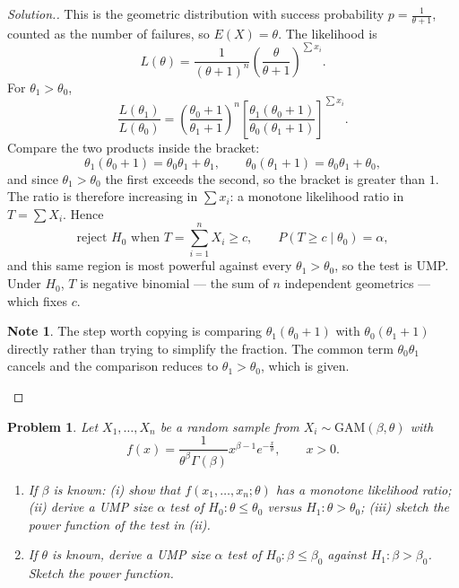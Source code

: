 \documentclass[12pt,a4paper]{report}
\theoremstyle{definition}
\newtheorem{note}[thm]{Note}
\theoremstyle{plain}
\newtheorem{problemx}{Problem}[section]
\newenvironment{problem}{\begin{problemx}}{\end{problemx}}
\newenvironment{solution}
  {\renewcommand{\qedsymbol}{}\begin{proof}[\textit{Solution}.]}
  {\end{proof}}
\begin{document}
\begin{solution}
This is the geometric distribution with success probability
$p=\frac{1}{\theta+1}$, counted as the number of failures, so $E(X)=\theta$. The
likelihood is
\[L(\theta)=\frac{1}{(\theta+1)^n}\left(\frac{\theta}{\theta+1}\right)^{\sum x_i}.\]
For $\theta_1>\theta_0$,
\[\frac{L(\theta_1)}{L(\theta_0)}
=\left(\frac{\theta_0+1}{\theta_1+1}\right)^{n}
\left[\frac{\theta_1(\theta_0+1)}{\theta_0(\theta_1+1)}\right]^{\sum x_i}.\]
Compare the two products inside the bracket:
\[\theta_1(\theta_0+1)=\theta_0\theta_1+\theta_1,\qquad
\theta_0(\theta_1+1)=\theta_0\theta_1+\theta_0,\]
and since $\theta_1>\theta_0$ the first exceeds the second, so the bracket is
greater than $1$. The ratio is therefore increasing in $\sum x_i$: a monotone
likelihood ratio in $T=\sum X_i$. Hence
\[\text{reject } H_0 \text{ when } T=\sum_{i=1}^nX_i\geq c,\qquad
P\left(T\geq c\mid\theta_0\right)=\alpha,\]
and this same region is most powerful against every $\theta_1>\theta_0$, so the
test is UMP. Under $H_0$, $T$ is negative binomial --- the sum of $n$ independent
geometrics --- which fixes $c$.

\begin{note}
The step worth copying is comparing $\theta_1(\theta_0+1)$ with
$\theta_0(\theta_1+1)$ directly rather than trying to simplify the fraction. The
common term $\theta_0\theta_1$ cancels and the comparison reduces to
$\theta_1>\theta_0$, which is given.
\end{note}
\end{solution}

\begin{problem}
Let $X_1,\ldots,X_n$ be a random sample from $X_i\sim\text{GAM}(\beta,\theta)$ with
\[f(x)=\frac{1}{\theta^\beta\Gamma(\beta)}x^{\beta-1}e^{-\frac{x}{\theta}},
\qquad x>0.\]
\begin{enumerate}
\item[(a).] If $\beta$ is known: (i) show that $f(x_1,\ldots,x_n;\theta)$ has a
monotone likelihood ratio; (ii) derive a UMP size $\alpha$ test of
$H_0:\theta\leq\theta_0$ versus $H_1:\theta>\theta_0$; (iii) sketch the power
function of the test in (ii).
\item[(b).] If $\theta$ is known, derive a UMP size $\alpha$ test of
$H_0:\beta\leq\beta_0$ against $H_1:\beta>\beta_0$. Sketch the power function.
\end{enumerate}
\end{problem}
\end{document}
